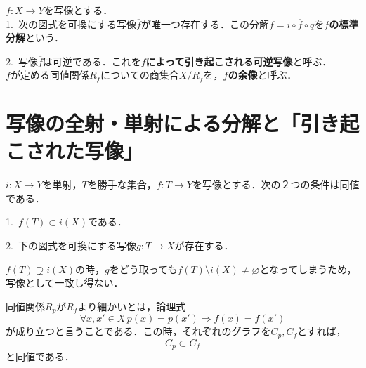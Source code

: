 \documentclass[uplatex, 12pt, dvipdfmx]{jsreport}
\begin{document}
\begin{proposition}
    $f:X\to Y$を写像とする．\\
    1.\, 次の図式を可換にする写像$\overline{f}$が唯一つ存在する．この分解$f=i\circ\overline{f}\circ q$を\textbf{$f$の標準分解}という．
    \begin{center}\end{center}
    2.\, 写像$\overline{f}$は可逆である．これを\textbf{$f$によって引き起こされる可逆写像}と呼ぶ．\\
    $f$が定める同値関係$R_f$についての商集合$X/R_f$を，\textbf{$f$の余像}と呼ぶ．
\end{proposition}

\section{写像の全射・単射による分解と「引き起こされた写像」}

\begin{proposition}[単射と一般の写像]\rm{}
    $i:X\to Y$を単射，$T$を勝手な集合，$f:T\to Y$を写像とする．次の２つの条件は同値である．
    
    1.\, $f(T)\subset i(X)$である．

    2.\, 下の図式を可換にする写像$g:T\to X$が存在する．
    \begin{center}\end{center}
\end{proposition}
$f(T)\supsetneq i(X)$の時，$g$をどう取っても$f(T)\setminus i(X)\ne\varnothing$となってしまうため，写像として一致し得ない．

\begin{definition}[同値関係の関係]\label{def-relationship-between-equivalence-relation}
    同値関係$R_p$が$R_f$より細かいとは，論理式
    \[ \forall x,x'\in X \, p(x)=p(x')\Rightarrow f(x)=f(x') \]
    が成り立つと言うことである．この時，それぞれのグラフを$C_p, C_f$とすれば，
    \[ C_p \subset C_f \]
    と同値である．
\end{definition}
\end{document}
